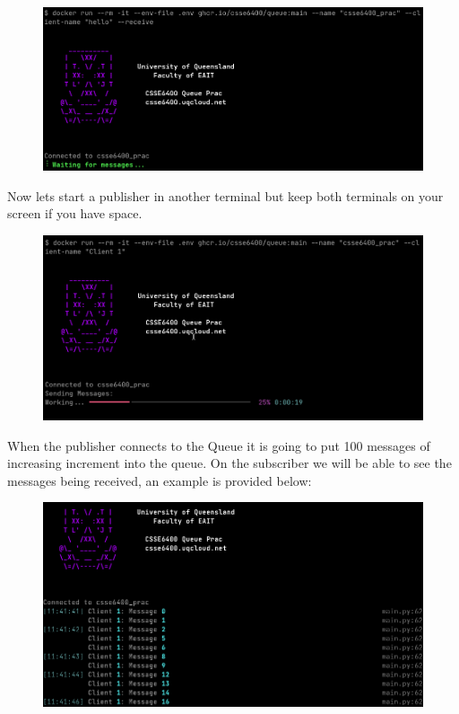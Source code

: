 \documentclass{csse4400}
\begin{document}
\begin{figure}[H]
  \includegraphics[width=\textwidth]{images/stacksub}
\end{figure}

Now lets start a publisher in another terminal but keep both terminals on your screen if you have space.


\begin{figure}[H]
  \includegraphics[width=\textwidth]{images/stackpub}
\end{figure}

When the publisher connects to the Queue it is going to put 100 messages of increasing increment into the queue. On the subscriber we will be able to see the messages being received, an example is provided below:

\begin{figure}[H]
  \includegraphics[width=\textwidth]{images/stacksubdata}
\end{figure}
\end{document}
